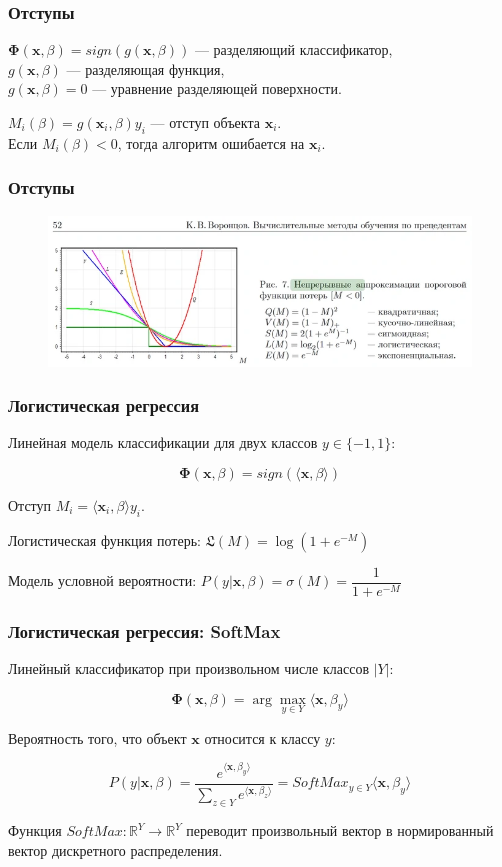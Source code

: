 \documentclass[11pt]{beamer}
\begin{document}
	\begin{frame}
		\frametitle{Отступы}
		
		$\bm{\Phi}(\bm{x}, \beta) = sign  (g(\bm{x}, \beta))$ --- разделяющий классификатор,\\
		$g(\bm{x}, \beta)$ --- разделяющая функция,\\
		$g(\bm{x}, \beta) = 0$ --- уравнение разделяющей поверхности.\\
		
		\bigskip
		
		$M_i(\beta) = g(\bm{x}_i, \beta) y_i$ --- отступ объекта $\bm{x}_i$. \\
		Если $M_i(\beta) < 0$, тогда алгоритм ошибается на $\bm{x}_i$.
	
	\end{frame}

	\begin{frame}
		\frametitle{Отступы}
		\begin{figure}
			\centering
			\includegraphics[width=0.7\linewidth]{../Report/imgs/margins}
			
			\label{fig:margins}
		\end{figure}
	\end{frame}

	\begin{frame}
	\frametitle{Логистическая регрессия}
	
			Линейная модель классификации для двух классов $y \in \{-1, 1\}$: 
			
			$$ \bm{\Phi}(\bm{x}, \beta) = sign  (\langle \bm{x}, \beta \rangle) $$
			
			Отступ $M_i = \langle \bm{x}_i, \beta \rangle y_i$.
			
			Логистическая функция потерь: $\mathfrak{L}(M) = \log (1 + e^{-M})$
			
			Модель условной вероятности: $ P(y| \bm{x}, \beta) = \sigma(M) = \dfrac{1}{1+e^{-M}}$ 
		
	\end{frame}

	\begin{frame}
		\frametitle{Логистическая регрессия: SoftMax}
		Линейный классификатор при произвольном числе классов $|Y|$:
		
		$$\bm{\Phi}(\bm{x}, \beta) = \arg \max\limits_{y \in Y} \langle \bm{x}, \beta_y \rangle $$
		
		Вероятность того, что объект $\bm{x}$ относится к классу $y$:
		
		$$ P(y| \bm{x}, \beta) = \dfrac{e^{\langle \bm{x}, \beta_y \rangle}}{\sum\limits_{z \in Y} e^{\langle \bm{x}, \beta_z \rangle}} = SoftMax_{y \in Y}\langle \bm{x}, \beta_y \rangle $$
		
		Функция $SoftMax: \mathbb{R}^Y \rightarrow \mathbb{R}^Y$ переводит произвольный вектор в нормированный вектор дискретного распределения.
	\end{frame}
\end{document}
